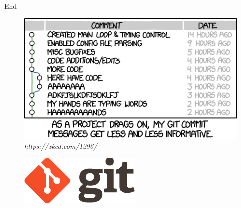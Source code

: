 \begin{frame}{End}
    \begin{minipage}{0.49\textheight}
        \begin{figure}
            \centering
            \includegraphics[width=\textwidth]{img/xkcd_git_commit.png}
            \caption{\textit{https://xkcd.com/1296/}}
        \end{figure}
    \end{minipage}
    \hspace{1cm}
    \begin{minipage}{0.49\textheight}
        \begin{figure}
        \centering
        \includegraphics[width=\textwidth]{img/git-logo.png}
        \end{figure}
    \end{minipage}
\end{frame}
